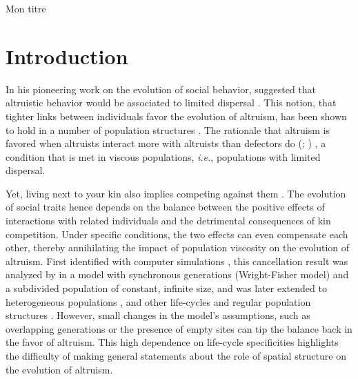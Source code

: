 \documentclass[11pt, letterpaper]{article}
\newcommand{\ie}{\textit{i.e.}}
\newcommand{\eg}{\textit{e.g.}}
\begin{document}
Mon titre 
\clearpage
\linenumbers
\pagestyle{maintext}
\section{Introduction}%
In his pioneering work on the evolution of social behavior, \citeauthor{Hamilton1964} suggested that altruistic behavior would be associated to limited dispersal \citep[p.~10]{Hamilton1964}. This notion, that tighter links between individuals favor the evolution of altruism, has been shown to hold in a number of population structures  \citep[see \eg][]{Ohtsuki2006, TaylorDayWild2007, Lehmann2007}. The rationale that altruism is favored when altruists interact more with altruists than defectors do (\citealp[p.~141]{Hamilton1975}; \citealp{Fletcher2009})%
, a condition that is met in viscous populations, \ie, populations with limited dispersal.

Yet, living next to your kin also implies competing against them \citep{West2002}. The evolution of social traits hence depends on the balance between the positive effects of interactions with related individuals and the detrimental consequences of kin competition. Under specific conditions, the two effects can even compensate each other, thereby annihilating the impact of population viscosity on the evolution of altruism. First identified with computer simulations \citep{Wilson1992}, this cancellation result was analyzed by \citet{Taylor1992islandmodel} in a model with synchronous generations (Wright-Fisher model) and a subdivided population of constant, infinite size, and was later extended to heterogeneous populations \citep[][with synchronous generations and infinite population size]{RodriguesGardner2012}, and other life-cycles and regular population structures \citep[][with synchronous generations but also with continuous generations and Birth-Death updating]{Taylor2011}. However, small changes in the model's assumptions, such as overlapping generations \citep{TaylorIrwin2000} or the presence of empty sites \citep{Alizon2008} can tip the balance back in the favor of altruism. This high dependence on life-cycle specificities highlights the difficulty of making general statements about the role of spatial structure on the evolution of altruism. 
\end{document}
